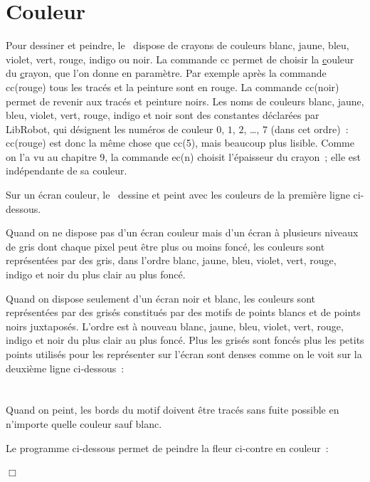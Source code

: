 \section{Couleur}

Pour dessiner et peindre, le \robot\ dispose de crayons de couleurs blanc, jaune, bleu, violet, vert, 
rouge, indigo ou noir. La commande {\idt cc} permet de choisir la \underline{c}ouleur du 
\underline{c}rayon, que l'on donne en paramètre. Par exemple après la commande {\idt cc(rouge)} 
tous les tracés et la peinture sont en rouge. La commande {\idt cc(noir)} permet de
revenir aux tracés et peinture noirs. Les noms de couleurs {\idt blanc}, {\idt jaune}, {\idt bleu},
{\idt violet}, {\idt vert}, {\idt rouge}, {\idt indigo} et {\idt noir} sont des constantes
déclarées par {\idt LibRobot}, qui désignent les numéros de couleur $0$, $1$, $2$, \ldots, $7$
(dans cet ordre)~: {\idt cc(rouge)} est donc la même chose que {\idt cc(5)}, mais beaucoup plus
lisible. Comme on l'a vu au chapitre 9, la commande {\idt ec(n)} choisit
l'épaisseur du crayon~; elle est indépendante de sa couleur.

Sur un écran couleur, le \robot\ dessine et peint avec les couleurs de la première
ligne ci-dessous.

Quand on ne dispose pas d'un écran couleur mais d'un écran à plusieurs niveaux de gris
dont chaque pixel peut être plus ou moins foncé, les
couleurs sont représentées par des gris, dans l'ordre blanc, 
jaune, bleu, violet, vert,  rouge, indigo et noir du plus clair au plus foncé.

Quand on dispose seulement d'un écran noir et blanc, les couleurs sont représentées par des
grisés constitués par des motifs de points blancs et de points noirs juxtaposés. L'ordre est
à nouveau blanc, 
jaune, bleu, violet, vert,  rouge, indigo et noir du plus clair au plus foncé. Plus les grisés sont
foncés plus les petits points utilisés pour les représenter sur l'écran sont denses comme
on le voit sur la deuxième ligne ci-dessous~:\\[1.8cm]
\ \\[1.8cm]
\ \\

Quand on peint, les bords du motif doivent être tracés sans fuite possible en n'importe quelle couleur sauf blanc. 

\newpage %
\begin{exemple}{\rm
 Le programme ci-dessous permet de peindre la fleur ci-contre en couleur~:\\[5cm]
 \vspace*{-5cm}
 
\noindent $\Box$ }\end{exemple}

